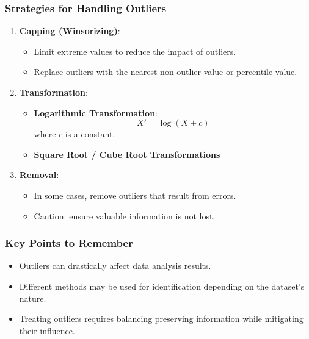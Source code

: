 \documentclass[aspectratio=169]{beamer}
\begin{document}
\begin{frame}[fragile]
    \frametitle{Strategies for Handling Outliers}
    \begin{enumerate}
        \item \textbf{Capping (Winsorizing)}:
            \begin{itemize}
                \item Limit extreme values to reduce the impact of outliers.
                \item Replace outliers with the nearest non-outlier value or percentile value.
            \end{itemize}
        \item \textbf{Transformation}:
            \begin{itemize}
                \item \textbf{Logarithmic Transformation}:
                    \begin{equation}
                      X' = \log(X + c)
                    \end{equation}
                    where $c$ is a constant.
                \item \textbf{Square Root / Cube Root Transformations}
            \end{itemize}
        \item \textbf{Removal}:
            \begin{itemize}
                \item In some cases, remove outliers that result from errors.
                \item Caution: ensure valuable information is not lost.
            \end{itemize}
    \end{enumerate}
\end{frame}

\begin{frame}[fragile]
    \frametitle{Key Points to Remember}
    \begin{itemize}
        \item Outliers can drastically affect data analysis results.
        \item Different methods may be used for identification depending on the dataset's nature.
        \item Treating outliers requires balancing preserving information while mitigating their influence.
    \end{itemize}
\end{frame}
\end{document}
